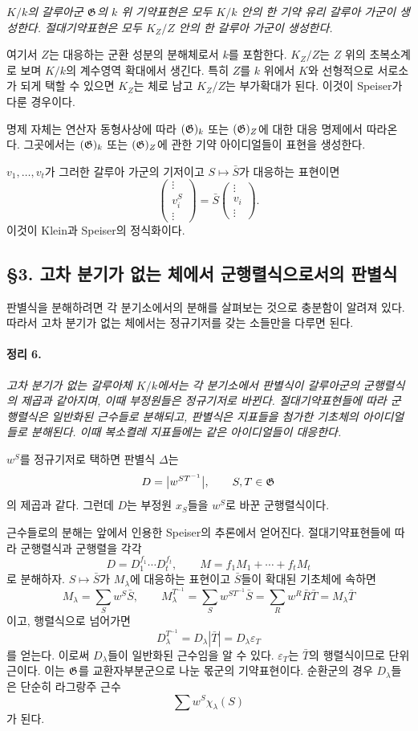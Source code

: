 \emph{\(K/k\)의 갈루아군 \(\mathfrak G\)의 \(k\) 위 기약표현은 모두 \(K/k\) 안의 한 기약 유리 갈루아 가군이 생성한다. 절대기약표현은 모두 \(K_Z/Z\) 안의 한 갈루아 가군이 생성한다.}

여기서 \(Z\)는 대응하는 군환 성분의 분해체로서 \(k\)를 포함한다. \(K_Z/Z\)는 \(Z\) 위의 초복소계로 보며 \(K/k\)의 계수영역 확대에서 생긴다. 특히 \(Z\)를 \(k\) 위에서 \(K\)와 선형적으로 서로소가 되게 택할 수 있으면 \(K_Z\)는 체로 남고 \(K_Z/Z\)는 부가확대가 된다. 이것이 Speiser가 다룬 경우이다.

명제 자체는 연산자 동형사상에 따라 \((\mathfrak G)_k\) 또는 \((\mathfrak G)_Z\)에 대한 대응 명제에서 따라온다. 그곳에서는 \((\mathfrak G)_k\) 또는 \((\mathfrak G)_Z\)에 관한 기약 아이디얼들이 표현을 생성한다.

\(v_1,\ldots,v_t\)가 그러한 갈루아 가군의 기저이고 \(S\mapsto\bar S\)가 대응하는 표현이면
\[
\begin{pmatrix}\vdots\\ v_i^S\\ \vdots\end{pmatrix}
=\bar S\begin{pmatrix}\vdots\\ v_i\\ \vdots\end{pmatrix}.
\]
이것이 Klein과 Speiser의 정식화이다.

\subsection*{§3. 고차 분기가 없는 체에서 군행렬식으로서의 판별식}

판별식을 분해하려면 각 분기소에서의 분해를 살펴보는 것으로 충분함이 알려져 있다. 따라서 고차 분기가 없는 체에서는 정규기저를 갖는 소들만을 다루면 된다.

\paragraph{정리 6.}
\emph{고차 분기가 없는 갈루아체 \(K/k\)에서는 각 분기소에서 판별식이 갈루아군의 군행렬식의 제곱과 같아지며, 이때 부정원들은 정규기저로 바뀐다. 절대기약표현들에 따라 군행렬식은 일반화된 근수들로 분해되고, 판별식은 지표들을 첨가한 기초체의 아이디얼들로 분해된다. 이때 복소켤레 지표들에는 같은 아이디얼들이 대응한다.}

\(w^S\)를 정규기저로 택하면 판별식 \(\Delta\)는
\[
D=\bigl|w^{ST^{-1}}\bigr|,\qquad S,T\in\mathfrak G
\]
의 제곱과 같다. 그런데 \(D\)는 부정원 \(x_S\)들을 \(w^S\)로 바꾼 군행렬식이다.

근수들로의 분해는 앞에서 인용한 Speiser의 추론에서 얻어진다. 절대기약표현들에 따라 군행렬식과 군행렬을 각각
\[
D=D_1^{f_1}\cdots D_t^{f_t},
\qquad
M=f_1M_1+\cdots+f_tM_t
\]
로 분해하자. \(S\mapsto\bar S\)가 \(M_\lambda\)에 대응하는 표현이고 \(\bar S\)들이 확대된 기초체에 속하면
\[
M_\lambda=\sum_S w^S\bar S,
\qquad
M_\lambda^{T^{-1}}=\sum_S w^{ST^{-1}}\bar S
=\sum_R w^R\bar R\bar T=M_\lambda\bar T
\]
이고, 행렬식으로 넘어가면
\[
D_\lambda^{T^{-1}}=D_\lambda|\bar T|
=D_\lambda\varepsilon_T
\]
를 얻는다. 이로써 \(D_\lambda\)들이 일반화된 근수임을 알 수 있다. \(\varepsilon_T\)는 \(\bar T\)의 행렬식이므로 단위근이다. 이는 \(\mathfrak G\)를 교환자부분군으로 나눈 몫군의 기약표현이다. 순환군의 경우 \(D_\lambda\)들은 단순히 라그랑주 근수
\[
\sum w^S\chi_\lambda(S)
\]
가 된다.

